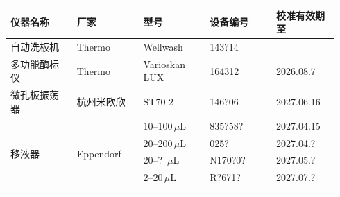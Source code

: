 \documentclass[UTF8,10pt,a4paper,fontset=fandol]{ctexart}
\newcommand{\fieldvalue}[1]{#1}
\newcommand{\handwritten}[1]{#1}
\begin{document}
\begin{center}
\begin{tabular}{|p{0.19\linewidth}|p{0.19\linewidth}|p{0.19\linewidth}|p{0.19\linewidth}|p{0.18\linewidth}|}
\hline
仪器名称 & 厂家 & 型号 & 设备编号 & 校准有效期至\\
\hline
自动洗板机 & Thermo & Wellwash &
\fieldvalue{\handwritten{143?14}} & \\
\hline
多功能酶标仪 & Thermo & Varioskan LUX &
\fieldvalue{\handwritten{164312}} &
\fieldvalue{\handwritten{2026.08.7}}\\
\hline
微孔板振荡器 & 杭州米欧欣 & ST70-2 &
\fieldvalue{\handwritten{146?06}} &
\fieldvalue{\handwritten{2027.06.16}}\\
\hline
\multirow{5}{*}{移液器} & \multirow{5}{*}{Eppendorf} &
10--100\,$\mu$L &
\fieldvalue{\handwritten{835?58?}} &
\fieldvalue{\handwritten{2027.04.15}}\\
\cline{3-5}
& & 20--200\,$\mu$L &
\fieldvalue{\handwritten{025?}} &
\fieldvalue{\handwritten{2027.04.?}}\\
\cline{3-5}
& & 20--?\, $\mu$L &
\fieldvalue{\handwritten{N170?0?}} &
\fieldvalue{\handwritten{2027.05.?}}\\
\cline{3-5}
& & 2--20\,$\mu$L &
\fieldvalue{\handwritten{R?671?}} &
\fieldvalue{\handwritten{2027.07.?}}\\
\cline{3-5}
& & & & \\
\hline
\end{tabular}
\end{center}
\end{document}
